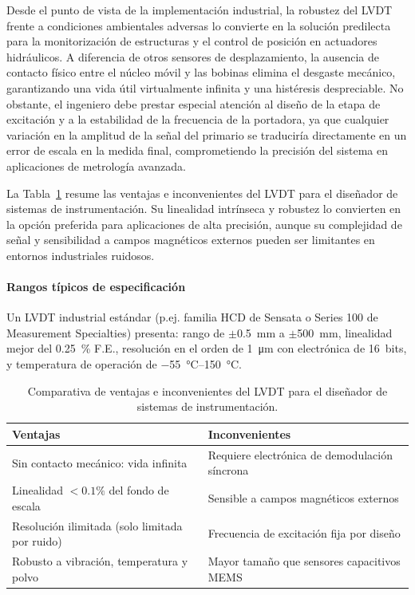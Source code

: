 Desde el punto de vista de la implementación industrial, la robustez del LVDT frente a condiciones ambientales adversas lo convierte en la solución predilecta para la monitorización de estructuras y el control de posición en actuadores hidráulicos. A diferencia de otros sensores de desplazamiento, la ausencia de contacto físico entre el núcleo móvil y las bobinas elimina el desgaste mecánico, garantizando una vida útil virtualmente infinita y una histéresis despreciable. No obstante, el ingeniero debe prestar especial atención al diseño de la etapa de excitación y a la estabilidad de la frecuencia de la portadora, ya que cualquier variación en la amplitud de la señal del primario se traduciría directamente en un error de escala en la medida final, comprometiendo la precisión del sistema en aplicaciones de metrología avanzada.


La Tabla~\ref{tab:lvdt_pro} resume las ventajas e inconvenientes del LVDT para el diseñador de sistemas de instrumentación. Su linealidad intrínseca y robustez lo convierten en la opción preferida para aplicaciones de alta precisión, aunque su complejidad de señal y sensibilidad a campos magnéticos externos pueden ser limitantes en entornos industriales ruidosos.

\paragraph{Rangos típicos de especificación}

Un LVDT industrial estándar (p.ej. familia HCD de Sensata o Series 100 de Measurement Specialties) presenta: rango de $\pm$\qty{0.5}{mm} a $\pm$\qty{500}{mm}, linealidad mejor del \qty{0.25}{\%} F.E., resolución en el orden de \qty{1}{\micro m} con electrónica de 16~bits, y temperatura de operación de \qtyrange{-55}{150}{\degreeCelsius}.

\begin{table}[!ht]
    \centering
    \caption[Ventajas e inconvenientes del LVDT.]{Comparativa de ventajas e inconvenientes del LVDT para el diseñador de sistemas de instrumentación.\protect\label{tab:lvdt_pro}}
    \begin{tabularx}{\linewidth}{X X}
        \toprule
        \textbf{Ventajas} & \textbf{Inconvenientes} \\
        \midrule
        Sin contacto mecánico: vida infinita & Requiere electrónica de demodulación síncrona \\
        Linealidad $< 0.1\%$ del fondo de escala & Sensible a campos magnéticos externos \\
        Resolución ilimitada (solo limitada por ruido) & Frecuencia de excitación fija por diseño \\
        Robusto a vibración, temperatura y polvo & Mayor tamaño que sensores capacitivos MEMS \\
        \bottomrule
    \end{tabularx}
\end{table}

